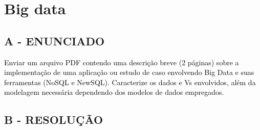 \label{ap:ap10}
\chapter{Big data}
\section*{\textbf{A - ENUNCIADO}}

\textcolor{black}{Enviar um arquivo PDF contendo uma descrição breve (2 páginas) sobre a implementação de uma aplicação
ou estudo de caso envolvendo Big Data e suas ferramentas (NoSQL e NewSQL). Caracterize os dados e Vs envolvidos, além
da modelagem necessária dependendo dos modelos de dados empregados.}

\section*{\textbf{B - RESOLUÇÃO}}
\lipsum[30]